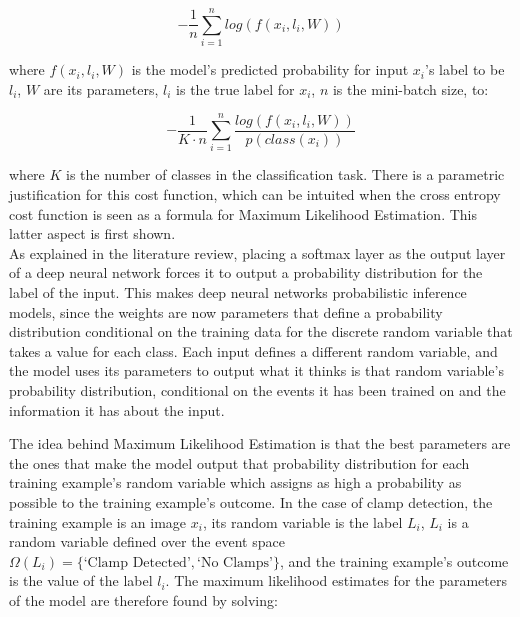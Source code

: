 \documentclass[a4paper,11pt]{article}
\begin{document}
\begin{equation}
-\frac{1}{n}\sum\limits_{i=1}^{n} log(f(x_i,l_i,W))
\end{equation}

where $f(x_i,l_i,W)$ is the model's predicted probability for input $x_i$'s label to be $l_i$, $W$ are its parameters, $l_i$ is the true label for $x_i$, $n$ is the mini-batch size, to:

\begin{equation}
-\frac{1}{K \cdot n}\sum\limits_{i=1}^{n} \frac{log(f(x_i,l_i,W))}{p(class(x_i))} 
\end{equation}

where $K$ is the number of classes in the classification task.
There is a parametric justification for this cost function, which can be intuited when the cross entropy cost function is seen as a formula for Maximum Likelihood Estimation. This latter aspect is first shown. \\

As explained in the literature review, placing a softmax layer as the output layer of a deep neural network forces it to output a probability distribution for the label of the input. This makes deep neural networks probabilistic inference models, since the weights are now parameters that define a probability distribution conditional on the training data for the discrete random variable that takes a value for each class. Each input defines a different random variable, and the model uses its parameters to output what it thinks is that random variable's probability distribution, conditional on the events it has been trained on and the information it has about the input. 

The idea behind Maximum Likelihood Estimation is that the best parameters are the ones that make the model output that probability distribution for each training example's random variable which assigns as high a probability as possible to the training example's outcome. In the case of clamp detection, the training example is an image $x_i$, its random variable is the label $L_i$, $L_i$ is a random variable defined over the event space $\Omega(L_i) = \{\text{`Clamp Detected'},\text{`No Clamps'}\}$, and the training example's outcome is the value of the label $l_i$. The maximum likelihood estimates for the parameters of the model are therefore found by solving:
\end{document}
